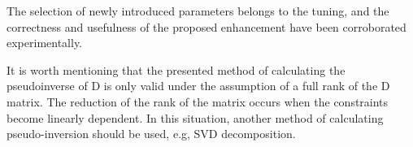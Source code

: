 The selection of newly introduced parameters belongs to the tuning, and the correctness and usefulness of the proposed enhancement have been corroborated experimentally.

It is worth mentioning that the presented method of calculating the pseudoinverse of D is only valid under the assumption of a full rank of the D matrix. The reduction of the rank of the matrix occurs when the constraints become linearly dependent. In this situation, another method of calculating pseudo-inversion should be used, e.g, SVD decomposition. \cite{golub2013matrix}\\


